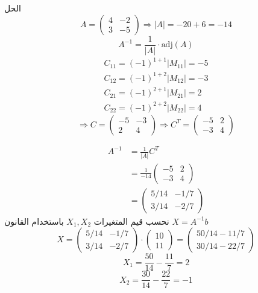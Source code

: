 	\begin{frame}
		\begin{exampleblock}{الحل}
			\[
			A = 
			\begin{pmatrix}
				4&-2\\
				3&-5
			\end{pmatrix}
			\Rightarrow |A| = -20+6=-14
			\]
			\[
			A^{-1} = \frac{1}{|A|}\cdot \text{adj}(A)
			\]
			\begin{align*}
				C_{11} = (-1)^{1+1} |M_{11}| = -5\\
				C_{12} = (-1)^{1+2} |M_{12}| = -3\\
				C_{21} = (-1)^{2+1} |M_{21}| = 2\\
				C_{22} = (-1)^{2+2} |M_{22}| = 4
			\end{align*}
			\[
			\Rightarrow C =
			\begin{pmatrix}
				-5& -3\\
				2&4
			\end{pmatrix}
			\Rightarrow C^T
			=\begin{pmatrix}
				-5&2\\
				-3&4
			\end{pmatrix}
			\]
		\end{exampleblock}
	\end{frame}
	
	\begin{frame}
		\begin{exampleblock}{}
				\begin{align*}
				A^{-1} &= \frac{1}{|A|}C^T\\
				&=\frac{1}{-14} 
				\begin{pmatrix}
					-5&2\\
					-3&4
				\end{pmatrix}\\
				&=
				\begin{pmatrix}
					5/14 & -1/7\\
					3/14 & -2/7
				\end{pmatrix}
			\end{align*}
			نحسب قيم المتغيرات $X_1, X_2 $ باستخدام القانون $X=A^{-1}b$
			\[
			X = 
			\begin{pmatrix}
				5/14 & -1/7\\
				3/14 & -2/7
			\end{pmatrix} \cdot
			\begin{pmatrix}
				10\\11
			\end{pmatrix}=
			\begin{pmatrix}
				50/14 - 11/7\\
				30/14 - 22/7
			\end{pmatrix}
			\]
			\[
			X_1 = \frac{50}{14} - \frac{11}{7} = 2
			\]
			\[
			X_2 = \frac{30}{14} - \frac{22}{7} = -1
			\]
		\end{exampleblock}
	\end{frame}
	
